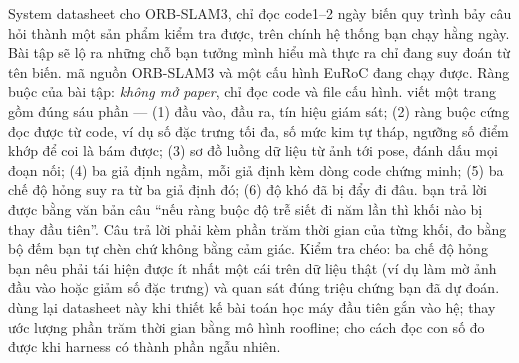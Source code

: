 \documentclass[../../deep_learning.tex]{subfiles}
\begin{document}
\begin{duan}{System datasheet cho ORB-SLAM3, chỉ đọc code}{1--2 ngày}
\dmt biến quy trình bảy câu hỏi thành một sản phẩm kiểm tra được, trên chính hệ thống bạn chạy hằng ngày. Bài tập sẽ lộ ra những chỗ bạn tưởng mình hiểu mà thực ra chỉ đang suy đoán từ tên biến.
\ddl mã nguồn ORB-SLAM3 \cite{campos2021orbslam3} và một cấu hình EuRoC đang chạy được. Ràng buộc của bài tập: \emph{không mở paper}, chỉ đọc code và file cấu hình.
\dbc viết một trang gồm đúng sáu phần --- (1) đầu vào, đầu ra, tín hiệu giám sát; (2) ràng buộc cứng đọc được từ code, ví dụ số đặc trưng tối đa, số mức kim tự tháp, ngưỡng số điểm khớp để coi là bám được; (3) sơ đồ luồng dữ liệu từ ảnh tới pose, đánh dấu mọi đoạn nối; (4) ba giả định ngầm, mỗi giả định kèm dòng code chứng minh; (5) ba chế độ hỏng suy ra từ ba giả định đó; (6) độ khó đã bị đẩy đi đâu.
\dxk bạn trả lời được bằng văn bản câu ``nếu ràng buộc độ trễ siết đi năm lần thì khối nào bị thay đầu tiên''. Câu trả lời phải kèm phần trăm thời gian của từng khối, đo bằng bộ đếm bạn tự chèn chứ không bằng cảm giác. Kiểm tra chéo: ba chế độ hỏng bạn nêu phải tái hiện được ít nhất một cái trên dữ liệu thật (ví dụ làm mờ ảnh đầu vào hoặc giảm số đặc trưng) và quan sát đúng triệu chứng bạn đã dự đoán.
\dnv {} dùng lại datasheet này khi thiết kế bài toán học máy đầu tiên gắn vào hệ;  thay ước lượng phần trăm thời gian bằng mô hình roofline;  cho cách đọc con số đo được khi harness có thành phần ngẫu nhiên.
\end{duan}

\begin{traloi}
\end{traloi}
\end{document}
